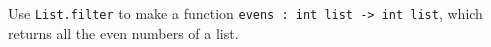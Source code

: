 Use \lstinline{List.filter} to make a function \lstinline{evens : int list -> int list}, which returns all the even numbers of a list.
